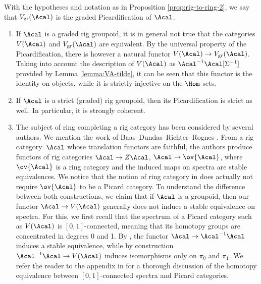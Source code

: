 \begin{definition}\label{def:gr-picardification}
With the hypotheses and notation as in Proposition \ref{prop:rig-to-ring-2}, we say that $V_{\mathrm{gr}}(\Acal)$ is the graded Picardification of $\Acal$.
\end{definition}

\skpt
\begin{remark}\label{rem:picardification}
\begin{enumerate}
\item\label{item:rem-picardification-1} If $\Acal$ is a graded rig groupoid, it is in general not true that the categories $V(\Acal)$ and $V_{\mathrm{gr}}(\Acal)$ are equivalent. By the universal property of the Picardification, there is however a natural functor $V(\Acal)\to V_{\mathrm{gr}}(\Acal)$. Taking into account the description of $V(\Acal)$ as $\Acal^{-1}\Acal[\Sigma^{-1}]$ provided by Lemma \ref{lemma:VA-tilde}, it can be seen that this functor is the identity on objects, while it is strictly injective on the $\Hom$ sets.
\item If $\Acal$ is a strict (graded) rig groupoid, then its Picardification is strict as well. In particular, it is strongly coherent.
\item\label{rem:picardification-3} The subject of ring completing a rig category has been considered by several authors. We mention the work of Baas--Dundas--Richter--Rognes \cite{BDRR}. From a rig \hbox{category}~$\Acal$ whose translation functors are faithful, the authors produce functors of rig categories $\Acal\to Z\Acal$, $\Acal\to\ov{\Acal}$, where $\ov{\Acal}$ is a ring category and the induced maps on spectra are stable equivalences. We notice that the notion of ring category in \cite{BDRR} does actually not require $\ov{\Acal}$ to be a Picard category. To understand the difference between both constructions, we claim that if $\Acal$ is a groupoid, then our functor $\Acal\to V(\Acal)$ generally does not induce a stable equivalence on spectra. For this, we first recall that the spectrum of a Picard category such as $V(\Acal)$ is $[0,1]$-connected, meaning that its homotopy groups are concentrated in degrees 0 and 1. By \cite[pp.\,1657--1658]{ThomasonSpectral}, the functor $\Acal\to\Acal^{-1}\Acal$ induces a stable equivalence, while by construction $\Acal^{-1}\Acal\to V(\Acal)$ induces isomorphisms only on $\pi_{0}$ and $\pi_{1}$. We refer the reader to the appendix in \cite{Patel} for a thorough discussion of the homotopy equivalence between $[0,1]$-connected spectra and Picard categories.
\end{enumerate}
\end{remark}


